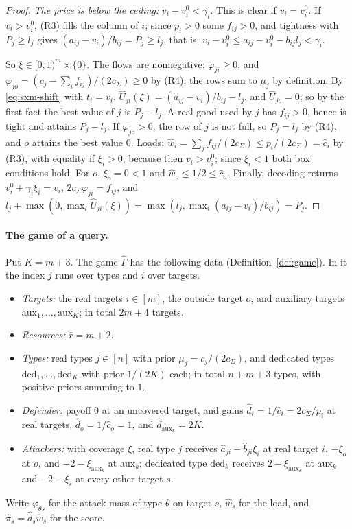 \begin{proof}
\emph{The price is below the ceiling:} $v_i-v_i^0<\gamma_i$. This is clear if $v_i=v_i^0$. If
$v_i>v_i^0$, (R3) fills the column of $i$; since $p_i>0$ some $f_{ij}>0$, and tightness with $P_j\ge l_j$
gives $(a_{ij}-v_i)/b_{ij}=P_j\ge l_j$, that is,
$v_i-v_i^0\le a_{ij}-v_i^0-b_{ij}l_j<\gamma_i$.

So $\xi\in[0,1)^m\times\{0\}$. The flows are nonnegative: $\varphi_{ji}\ge0$, and
$\varphi_{jo}=(c_j-\sum_if_{ij})/(2c_\Sigma)\ge0$ by (R4); the rows sum to $\mu_j$ by definition. By
\eqref{eq:sxm-shift} with $t_i=v_i$, $\hat U_{ji}(\xi)=(a_{ij}-v_i)/b_{ij}-l_j$, and $\hat U_{jo}=0$; so
by the first fact the best value of $j$ is $P_j-l_j$. A real good used by $j$ has $f_{ij}>0$, hence is
tight and attains $P_j-l_j$. If $\varphi_{jo}>0$, the row of $j$ is not full, so $P_j=l_j$ by (R4), and
$o$ attains the best value $0$. Loads: $\hat w_i=\sum_jf_{ij}/(2c_\Sigma)\le p_i/(2c_\Sigma)=\hat c_i$ by
(R3), with equality if $\xi_i>0$, because then $v_i>v_i^0$; since $\xi_i<1$ both box conditions hold. For
$o$, $\xi_o=0<1$ and $\hat w_o\le1/2\le\hat c_o$. Finally, decoding returns $v_i^0+\gamma_i\xi_i=v_i$,
$2c_\Sigma\varphi_{ji}=f_{ij}$, and $l_j+\max(0,\max_i\hat U_{ji}(\xi))=\max(l_j,\max_i(a_{ij}-v_i)/b_{ij})=P_j$.
\end{proof}

\paragraph{The game of a query.} Put $K=m+3$. The game $\widehat\Gamma$ has the following data
(Definition~\ref{def:game}). In it the index $j$ runs over types and $i$ over targets.
\begin{itemize}[nosep]
\item \emph{Targets:} the real targets $i\in[m]$, the outside target $o$, and auxiliary targets
$\mathrm{aux}_1,\dots,\mathrm{aux}_K$; in total $2m+4$ targets.
\item \emph{Resources:} $\hat r=m+2$.
\item \emph{Types:} real types $j\in[n]$ with prior $\mu_j=c_j/(2c_\Sigma)$, and dedicated types
$\mathrm{ded}_1,\dots,\mathrm{ded}_K$ with prior $1/(2K)$ each; in total $n+m+3$ types, with positive
priors summing to $1$.
\item \emph{Defender:} payoff $0$ at an uncovered target, and gains $\hat d_i=1/\hat c_i=2c_\Sigma/p_i$
at real targets, $\hat d_o=1/\hat c_o=1$, and $\hat d_{\mathrm{aux}_k}=2K$.
\item \emph{Attackers:} with coverage $\xi$, real type $j$ receives $\hat a_{ji}-\hat b_{ji}\xi_i$ at real
target $i$, $-\xi_o$ at $o$, and $-2-\xi_{\mathrm{aux}_k}$ at $\mathrm{aux}_k$; dedicated type
$\mathrm{ded}_k$ receives $2-\xi_{\mathrm{aux}_k}$ at $\mathrm{aux}_k$ and $-2-\xi_s$ at every other target
$s$.
\end{itemize}
Write $\varphi_{\theta s}$ for the attack mass of type $\theta$ on target $s$, $\hat w_s$ for the load,
and $\hat\pi_s=\hat d_s\hat w_s$ for the score.

